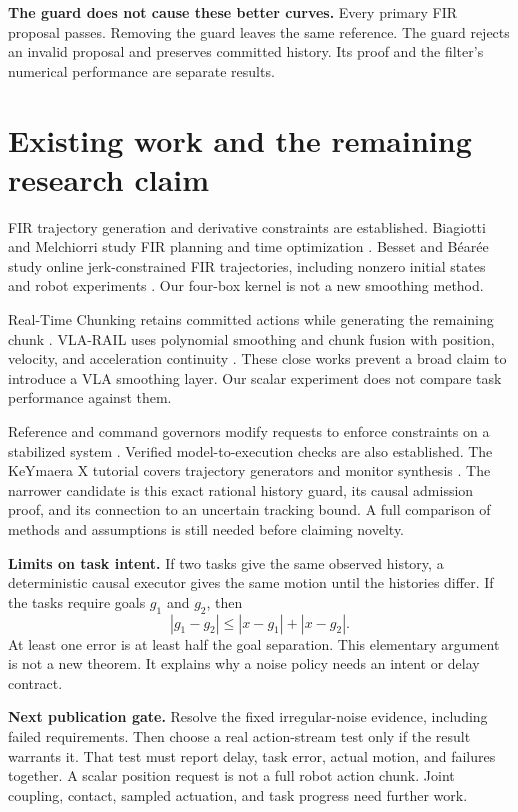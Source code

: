 \documentclass[11pt,letterpaper]{article}
\begin{document}
\textbf{The guard does not cause these better curves.} Every primary FIR proposal passes. Removing the guard leaves the same reference. The guard rejects an invalid proposal and preserves committed history. Its proof and the filter's numerical performance are separate results.

\newpage


\newpage
\section{Existing work and the remaining research claim}
FIR trajectory generation and derivative constraints are established. Biagiotti and Melchiorri study FIR planning and time optimization \cite{fir2012,fir2019}. Besset and B\'ear\'ee study online jerk-constrained FIR trajectories, including nonzero initial states and robot experiments \cite{fir2017}. Our four-box kernel is not a new smoothing method.

Real-Time Chunking retains committed actions while generating the remaining chunk \cite{rtc}. VLA-RAIL uses polynomial smoothing and chunk fusion with position, velocity, and acceleration continuity \cite{rail}. These close works prevent a broad claim to introduce a VLA smoothing layer. Our scalar experiment does not compare task performance against them.

Reference and command governors modify requests to enforce constraints on a stabilized system \cite{governors}. Verified model-to-execution checks are also established. The KeYmaera X tutorial covers trajectory generators and monitor synthesis \cite{keymaera}. The narrower candidate is this exact rational history guard, its causal admission proof, and its connection to an uncertain tracking bound. A full comparison of methods and assumptions is still needed before claiming novelty.

\textbf{Limits on task intent.} If two tasks give the same observed history, a deterministic causal executor gives the same motion until the histories differ. If the tasks require goals $g_1$ and $g_2$, then
\[
|g_1-g_2|\leq |x-g_1|+|x-g_2|.
\]
At least one error is at least half the goal separation. This elementary argument is not a new theorem. It explains why a noise policy needs an intent or delay contract.

\textbf{Next publication gate.} Resolve the fixed irregular-noise evidence, including failed requirements. Then choose a real action-stream test only if the result warrants it. That test must report delay, task error, actual motion, and failures together. A scalar position request is not a full robot action chunk. Joint coupling, contact, sampled actuation, and task progress need further work.
\end{document}
